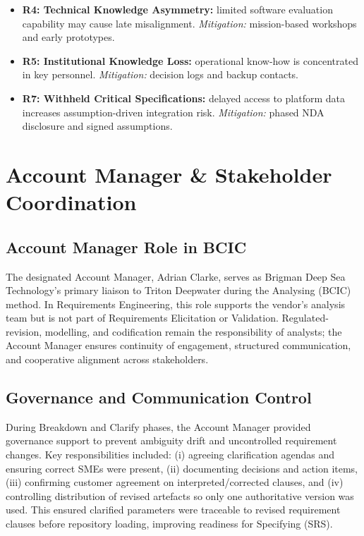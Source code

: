 \documentclass[11pt,a4paper]{article}
\begin{document}
\begin{itemize}[leftmargin=*,nosep]
  \item \textbf{R4: Technical Knowledge Asymmetry:} limited software evaluation capability may cause late misalignment. \textit{Mitigation:} mission-based workshops and early prototypes.
  \item \textbf{R5: Institutional Knowledge Loss:} operational know-how is concentrated in key personnel. \textit{Mitigation:} decision logs and backup contacts.
  \item \textbf{R7: Withheld Critical Specifications:} delayed access to platform data increases assumption-driven integration risk. \textit{Mitigation:} phased NDA disclosure and signed assumptions.
\end{itemize}

\section{Account Manager \& Stakeholder Coordination}

\subsection{Account Manager Role in BCIC}

The designated Account Manager, Adrian Clarke, serves as Brigman Deep Sea Technology’s primary liaison to Triton Deepwater during the Analysing (BCIC) method. In Requirements Engineering, this role supports the vendor’s analysis team but is not part of Requirements Elicitation or Validation. Regulated-revision, modelling, and codification remain the responsibility of analysts; the Account Manager ensures continuity of engagement, structured communication, and cooperative alignment across stakeholders.

\subsection{Governance and Communication Control}

During Breakdown and Clarify phases, the Account Manager provided governance support to prevent ambiguity drift and uncontrolled requirement changes. Key responsibilities included: (i) agreeing clarification agendas and ensuring correct SMEs were present, (ii) documenting decisions and action items, (iii) confirming customer agreement on interpreted/corrected clauses, and (iv) controlling distribution of revised artefacts so only one authoritative version was used. This ensured clarified parameters were traceable to revised requirement clauses before repository loading, improving readiness for Specifying (SRS).
\end{document}
